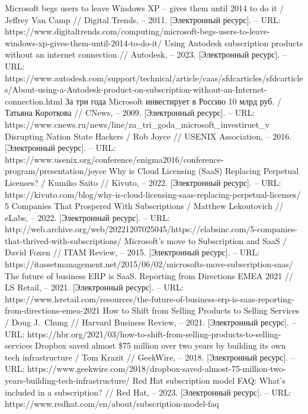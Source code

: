 \documentclass{article}
\begin{document}
\begin{thebibliography}{2}
 Microsoft begs users to leave Windows XP – gives them until 2014 to do it / Jeffrey Van Camp // Digital Trends, – 2011. [Электронный ресурс]. – URL: https://www.digitaltrends.com/computing/microsoft-begs-users-to-leave-windows-xp-gives-them-until-2014-to-do-it/
 Using Autodesk subscription products without an internet connection // Autodesk, – 2023. [Электронный ресурс]. – URL: https://www.autodesk.com/support/technical/article/caas/sfdcarticles/sfdcarticles/About-using-a-Autodesk-product-on-subscription-without-an-Internet-connection.html
 За три года Microsoft инвестирует в Россию 10 млрд руб. / Татьяна Короткова // CNews, – 2009. [Электронный ресурс]. – URL: https://www.cnews.ru/news/line/za\_tri\_goda\_microsoft\_investiruet\_v
 Disrupting Nation State Hackers / Rob Joyce // USENIX Association, – 2016. [Электронный ресурс]. – URL: https://www.usenix.org/conference/enigma2016/conference-program/presentation/joyce
 Why is Cloud Licensing (SaaS) Replacing Perpetual Licenses? / Kumiko Saito // Kivuto, – 2022. [Электронный ресурс]. – URL: https://kivuto.com/blog/why-is-cloud-licensing-saas-replacing-perpetual-licenses/
 5 Companies That Prospered With Subscriptions / Matthew Lekoutovich // eLabs, – 2022. [Электронный ресурс]. – URL: http://web.archive.org/web/20221207025045/https://elabsinc.com/5-companies-that-thrived-with-subscriptions/
 Microsoft's move to Subscription and SaaS / David Foxen // ITAM Review, – 2015. [Электронный ресурс]. – URL: https://itassetmanagement.net/2015/06/02/microsofts-move-subscription-saas/
 The future of business ERP is SaaS. Reporting from Directions EMEA 2021 // LS Retail, – 2021. [Электронный ресурс]. – URL: https://www.lsretail.com/resources/the-future-of-business-erp-is-saas-reporting-from-directions-emea-2021
 How to Shift from Selling Products to Selling Services / Doug J.~Chung // Harvard Business Review, – 2021. [Электронный ресурс]. – URL: https://hbr.org/2021/03/how-to-shift-from-selling-products-to-selling-services
 Dropbox saved almost \$75 million over two years by building its own tech infrastructure / Tom Krazit // GeekWire, – 2018. [Электронный ресурс]. – URL: https://www.geekwire.com/2018/dropbox-saved-almost-75-million-two-years-building-tech-infrastructure/
 Red Hat subscription model FAQ: What's included in a subscription? // Red Hat, – 2023. [Электронный ресурс]. – URL: https://www.redhat.com/en/about/subscription-model-faq

\end{thebibliography}
\end{document}
